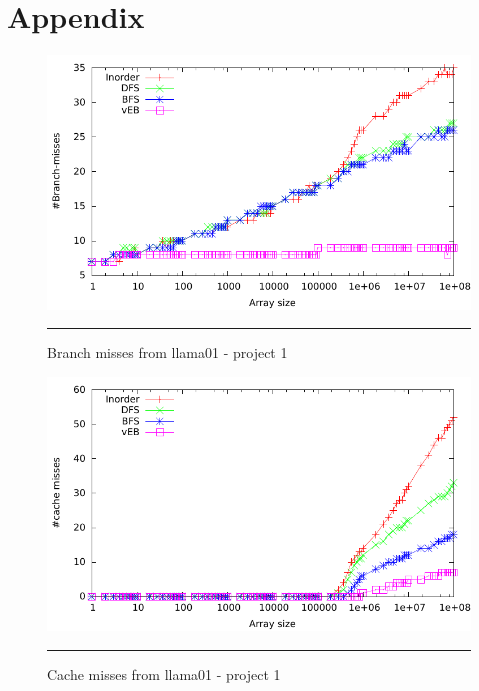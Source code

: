 
\chapter{Appendix} %

\label{AppendixA} %

\begin{figure}[ht]
	\centering
		\includegraphics[width=\textwidth]{./Appendices/Figures/Project1/Branch_misses-Putty.pdf}
		\rule{35em}{0.5pt}
	\caption*{
	Branch misses from llama01 - project 1
	}
	\label{fig:Branch_misses_p1putty}
\end{figure}
\begin{figure}[ht]
	\centering
		\includegraphics[width=\textwidth]{./Appendices/Figures/Project1/Cache_misses-putty.pdf}
		\rule{35em}{0.5pt}
	\caption*{
	Cache misses from llama01 - project 1
	}
	\label{fig:Cache_misses_p1putty}
\end{figure}
